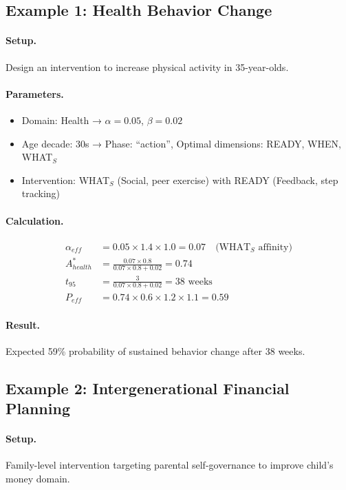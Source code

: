 \subsection{Example 1: Health Behavior Change}

\paragraph{Setup.} Design an intervention to increase physical activity in 35-year-olds.

\paragraph{Parameters.}
\begin{itemize}
\item Domain: Health → $\alpha = 0.05$, $\beta = 0.02$
\item Age decade: 30s → Phase: ``action'', Optimal dimensions: READY, WHEN, WHAT$_S$
\item Intervention: WHAT$_S$ (Social, peer exercise) with READY (Feedback, step tracking)
\end{itemize}

\paragraph{Calculation.}
\begin{align}
\alpha_{eff} &= 0.05 \times 1.4 \times 1.0 = 0.07 \quad \text{(WHAT$_S$ affinity)} \\
A^*_{health} &= \frac{0.07 \times 0.8}{0.07 \times 0.8 + 0.02} = 0.74 \\
t_{95} &= \frac{3}{0.07 \times 0.8 + 0.02} = 38 \text{ weeks} \\
P_{eff} &= 0.74 \times 0.6 \times 1.2 \times 1.1 = 0.59
\end{align}

\paragraph{Result.} Expected 59\% probability of sustained behavior change after 38 weeks.

\subsection{Example 2: Intergenerational Financial Planning}

\paragraph{Setup.} Family-level intervention targeting parental self-governance to improve child's money domain.

